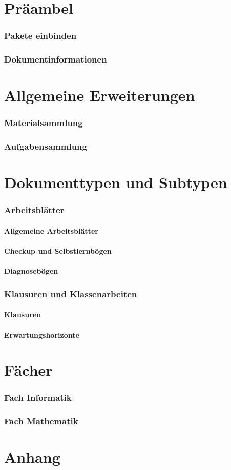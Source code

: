 \documentclass[a4paper,add-index]{cnltx-doc}
\begin{document}


\part{Präambel}
\section{Pakete einbinden}
\section{Dokumentinformationen}

\part{Allgemeine Erweiterungen}
\section{Materialsammlung}
\section{Aufgabensammlung}


\part{Dokumenttypen und Subtypen}
\section{Arbeitsblätter}
\subsection{Allgemeine Arbeitsblätter}
\subsection{Checkup und Selbstlernbögen}
\subsection{Diagnosebögen}

\section{Klausuren und Klassenarbeiten}
\subsection{Klausuren}
\subsection{Erwartungshorizonte}

\part{Fächer}
\section{Fach Informatik}
\section{Fach Mathematik}

\part{Anhang}
\end{document}
